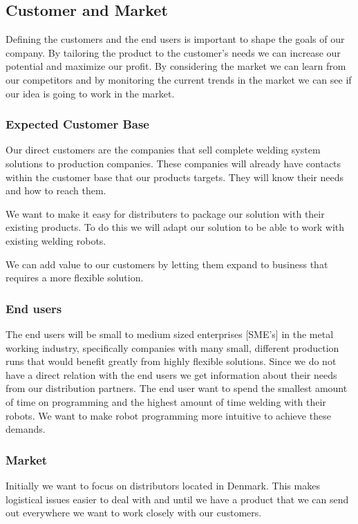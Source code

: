 \subsection{Customer and Market}

Defining the customers and the end users is important to shape the goals of our company. 
By tailoring the product to the customer's needs we can increase our potential and maximize our profit. 
By considering the market we can learn from our competitors and by monitoring the current trends in the market we can see if our idea is going to work in the market. 

\subsubsection{Expected Customer Base}
Our direct customers are the companies that sell complete welding system solutions to production companies. 
These companies will already have contacts within the customer base that our products targets.
They will know their needs and how to reach them. 

We want to make it easy for distributers to package our solution with their existing products.
To do this we will adapt our solution to be able to work with existing welding robots.

We can add value to our customers by letting them expand to business that requires a more flexible solution.

\subsubsection{End users}
The end users will be small to medium sized enterprises [SME's] in the metal working industry, specifically companies with many small, different production runs that would benefit greatly from highly flexible solutions.
Since we do not have a direct relation with the end users we get information about their needs from our distribution partners.
The end user want to spend the smallest amount of time on programming and the highest amount of time welding with their robots.
We want to make robot programming more intuitive to achieve these demands.

\subsubsection{Market}
Initially we want to focus on distributors located in Denmark.
This makes logistical issues easier to deal with and until we have a product that we can send out everywhere we want to work closely with our customers.


